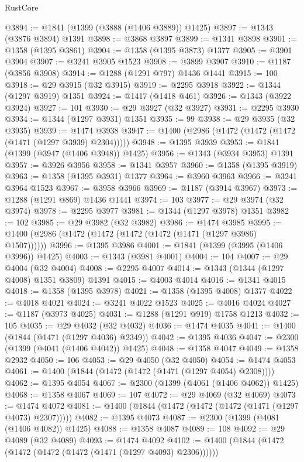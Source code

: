 \begin{lexlean}{RustCore}
\begin{coremodule}
@3894 := @1841 (@1399 (@3888 (@1406 @3889)) @1425)
@3897 := @1343 (@3876 @3894) @1391
@3898 := @3868 @3897
@3899 := @1341 @3898
@3901 := @1358 (@1395 @3861)
@3904 := @1358 (@1395 @3873) @1377
@3905 := @3901 @3904
@3907 := @3241 @3905 @1523
@3908 := @3899 @3907
@3910 := @1187 (@3856 @3908)
@3914 := @1288 (@1291 @797) @1436 @1441
@3915 := 100
@3918 := @29 @3915 (@32 @3915)
@3919 := @2295 @3918
@3922 := @1344 (@1297 @3919) @1351
@3924 := @1417 (@1418 @461)
@3926 := @1343 (@3922 @3924)
@3927 := 101
@3930 := @29 @3927 (@32 @3927)
@3931 := @2295 @3930
@3934 := @1344 (@1297 @3931) @1351
@3935 := 99
@3938 := @29 @3935 (@32 @3935)
@3939 := @1474 @3938
@3947 := @1400 (@2986 (@1472 (@1472 (@1472 (@1471 (@1297 @3939) @2304)))))
@3948 := @1395 @3939
@3953 := @1841 (@1399 (@3947 (@1406 @3948)) @1425)
@3956 := @1343 (@3934 @3953) @1391
@3957 := @3926 @3956
@3958 := @1341 @3957
@3960 := @1358 (@1395 @3919)
@3963 := @1358 (@1395 @3931) @1377
@3964 := @3960 @3963
@3966 := @3241 @3964 @1523
@3967 := @3958 @3966
@3969 := @1187 (@3914 @3967)
@3973 := @1288 (@1291 @869) @1436 @1441
@3974 := 103
@3977 := @29 @3974 (@32 @3974)
@3978 := @2295 @3977
@3981 := @1344 (@1297 @3978) @1351
@3982 := 102
@3985 := @29 @3982 (@32 @3982)
@3986 := @1474 @3985
@3995 := @1400 (@2986 (@1472 (@1472 (@1472 (@1472 (@1471 (@1297 @3986) @1507))))))
@3996 := @1395 @3986
@4001 := @1841 (@1399 (@3995 (@1406 @3996)) @1425)
@4003 := @1343 (@3981 @4001)
@4004 := 104
@4007 := @29 @4004 (@32 @4004)
@4008 := @2295 @4007
@4014 := @1343 (@1344 (@1297 @4008) @1351 @3809) @1391
@4015 := @4003 @4014
@4016 := @1341 @4015
@4018 := @1358 (@1395 @3978)
@4021 := @1358 (@1395 @4008) @1377
@4022 := @4018 @4021
@4024 := @3241 @4022 @1523
@4025 := @4016 @4024
@4027 := @1187 (@3973 @4025)
@4031 := @1288 (@1291 @919) @1758 @1213
@4032 := 105
@4035 := @29 @4032 (@32 @4032)
@4036 := @1474 @4035
@4041 := @1400 (@1844 (@1471 (@1297 @4036) @2349))
@4042 := @1395 @4036
@4047 := @2300 (@1399 (@4041 (@1406 @4042)) @1425)
@4048 := @1358 @4047
@4049 := @1358 @2932
@4050 := 106
@4053 := @29 @4050 (@32 @4050)
@4054 := @1474 @4053
@4061 := @1400 (@1844 (@1472 (@1472 (@1471 (@1297 @4054) @2308))))
@4062 := @1395 @4054
@4067 := @2300 (@1399 (@4061 (@1406 @4062)) @1425)
@4068 := @1358 @4067
@4069 := 107
@4072 := @29 @4069 (@32 @4069)
@4073 := @1474 @4072
@4081 := @1400 (@1844 (@1472 (@1472 (@1472 (@1471 (@1297 @4073) @2307)))))
@4082 := @1395 @4073
@4087 := @2300 (@1399 (@4081 (@1406 @4082)) @1425)
@4088 := @1358 @4087
@4089 := 108
@4092 := @29 @4089 (@32 @4089)
@4093 := @1474 @4092
@4102 := @1400 (@1844 (@1472 (@1472 (@1472 (@1472 (@1471 (@1297 @4093) @2306))))))

\end{coremodule}
\end{lexlean}
